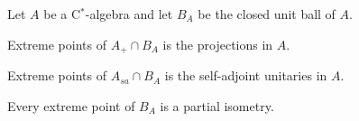 \documentclass{../../large}
\begin{document}
\begin{prb}[Representations of $K(H)$]
\end{prb}

\begin{prb}
\end{prb}


\begin{prb}
\end{prb}


\begin{prb}
\end{prb}

\begin{prb}
\end{prb}

\begin{prb}
Let $A$ be a C$^*$-algebra and let $B_A$ be the closed unit ball of $A$.
\begin{parts}
\item Extreme points of $A_+\cap B_A$ is the projections in $A$.
\item Extreme points of $A_{sa}\cap B_A$ is the self-adjoint unitaries in $A$.
\item Every extreme point of $B_A$ is a partial isometry.
\end{parts}
\end{prb}
\end{document}
